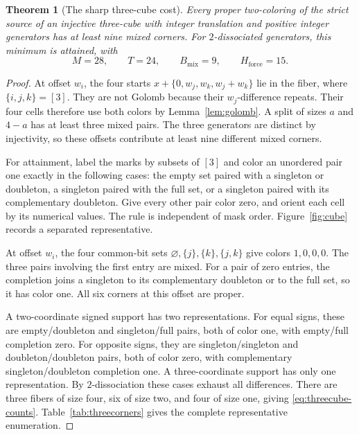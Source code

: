 \documentclass[11pt,a4paper]{article}
\newtheorem{theorem}{Theorem}[section]
\theoremstyle{definition}
\newcommand{\mix}{B_{\mathrm{mix}}}
\newcommand{\force}{H_{\mathrm{force}}}
\numberwithin{equation}{section}
\begin{document}
\begin{theorem}[The sharp three-cube cost]\label{thm:nine}
Every proper two-coloring of the strict source of an injective
three-cube with integer translation and positive integer generators
has at least nine mixed corners. For $2$-dissociated generators,
this minimum is attained, with
\begin{equation}\label{eq:threecube-counts}
M=28,\qquad T=24,\qquad \mix=9,\qquad \force=15.
\end{equation}
\end{theorem}
\begin{proof}
At offset $w_i$, the four starts
$x+\{0,w_j,w_k,w_j+w_k\}$ lie in the fiber, where $\{i,j,k\}=[3]$.
They are not Golomb because their $w_j$-difference repeats.
Their four cells therefore use both colors by Lemma~\ref{lem:golomb}.
A split of sizes $a$ and $4-a$ has at least three mixed pairs.
The three generators are distinct by injectivity, so these offsets
contribute at least nine different mixed corners.

For attainment, label the marks by subsets of $[3]$ and color an
unordered pair one exactly in the following cases: the empty set
paired with a singleton or doubleton, a singleton paired with the
full set, or a singleton paired with its complementary doubleton.
Give every other pair color zero, and orient each cell by its
numerical values. The rule is independent of mask
order. Figure~\ref{fig:cube} records a separated representative.

At offset $w_i$, the four common-bit sets
$\varnothing,\{j\},\{k\},\{j,k\}$ give colors $1,0,0,0$.
The three pairs involving the first entry are mixed.
For a pair of zero entries, the completion joins a singleton to its
complementary doubleton or to the full set, so it has color one.
All six corners at this offset are proper.

A two-coordinate signed support has two representations.
For equal signs, these are empty/doubleton and singleton/full pairs,
both of color one, with empty/full completion zero.
For opposite signs, they are singleton/singleton and doubleton/doubleton
pairs, both of color zero, with complementary singleton/doubleton
completion one. A three-coordinate support has only one representation.
By $2$-dissociation these cases exhaust all differences.
There are three fibers of size four, six of size two, and four of
size one, giving \eqref{eq:threecube-counts}.
Table~\ref{tab:threecorners} gives the complete representative enumeration.
\end{proof}
\end{document}
